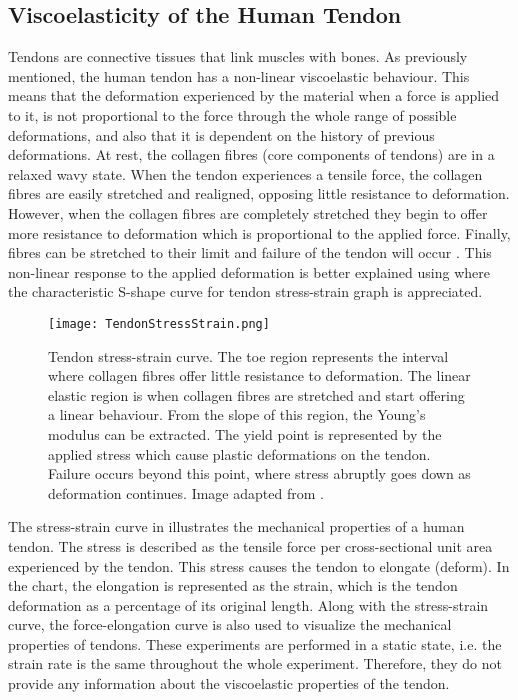 \subsection{Viscoelasticity of the Human Tendon} \label{sec:viscoelasticity}

Tendons are connective tissues that link muscles with bones. As previously mentioned, the human tendon has a non-linear viscoelastic behaviour. This means that the deformation experienced by the material when a force is applied to it, is not proportional to the force through the whole range of possible deformations, and also that it is dependent on the history of previous deformations. At rest, the collagen fibres (core components of tendons) are in a relaxed wavy state. When the tendon experiences a tensile force, the collagen fibres are easily stretched and realigned, opposing little resistance to deformation. However, when the collagen fibres are completely stretched they begin to offer more resistance to deformation which is proportional to the applied force. Finally, fibres can be stretched to their limit and failure of the tendon will occur \cite{nordin2001basic}. This non-linear response to the applied deformation is better explained using  where the characteristic S-shape curve for tendon stress-strain graph is appreciated.

\begin{figure}[htb!]
    \centering
    \texttt{[image: TendonStressStrain.png]}
    \caption{Tendon stress-strain curve. The toe region represents the interval where collagen fibres offer little resistance to deformation. The linear elastic region is when collagen fibres are stretched and start offering a linear behaviour. From the slope of this region, the Young's modulus can be extracted. The yield point is represented by the applied stress which cause plastic deformations on the tendon. Failure occurs beyond this point, where stress abruptly goes down as deformation continues. Image adapted from \cite{maurel1998biomechanical}. }
    \label{fig:tendonSS}
\end{figure}

The stress-strain curve in  illustrates the mechanical properties of a human tendon. The stress is described as the tensile force per cross-sectional unit area experienced by the tendon. This stress causes the tendon to elongate (deform). In the chart, the elongation is represented as the strain, which is the tendon deformation as a percentage of its original length. Along with the stress-strain curve, the force-elongation curve is also used to visualize the mechanical properties of tendons. These experiments are performed in a static state, i.e. the strain rate is the same throughout the whole experiment. Therefore, they do not provide any information about the viscoelastic properties of the tendon.


